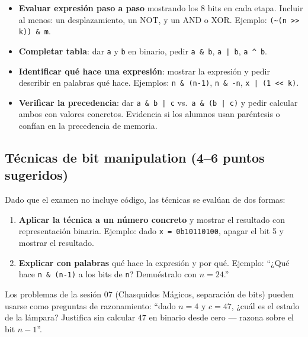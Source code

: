 \documentclass[12pt, oneside]{article}
\begin{document}
\begin{notaprofesor}
  \begin{itemize}
    \item \textbf{Evaluar expresión paso a paso} mostrando los 8 bits en cada
          etapa.  Incluir al menos: un desplazamiento, un NOT, y un AND o XOR.
          Ejemplo: \texttt{(\textasciitilde(n >> k)) \& m}.
    \item \textbf{Completar tabla}: dar \texttt{a} y \texttt{b} en binario,
          pedir \texttt{a \& b}, \texttt{a | b}, \texttt{a \textasciicircum{} b}.
    \item \textbf{Identificar qué hace una expresión}: mostrar la expresión y
          pedir describir en palabras qué hace.  Ejemplos:
          \texttt{n \& (n-1)}, \texttt{n \& -n}, \texttt{x | (1 << k)}.
    \item \textbf{Verificar la precedencia}: dar \texttt{a \& b | c} vs.\
          \texttt{a \& (b | c)} y pedir calcular ambos con valores concretos.
          Evidencia si los alumnos usan paréntesis o confían en la precedencia
          de memoria.
  \end{itemize}
\end{notaprofesor}

\subsection{Técnicas de bit manipulation (4–6 puntos sugeridos)}

\begin{notaprofesor}
  Dado que el examen no incluye código, las técnicas se evalúan de dos formas:
  \begin{enumerate}
    \item \textbf{Aplicar la técnica a un número concreto} y mostrar el resultado
          con representación binaria.  Ejemplo: dado \texttt{x = 0b10110100},
          apagar el bit 5 y mostrar el resultado.
    \item \textbf{Explicar con palabras} qué hace la expresión y por qué.
          Ejemplo: ``¿Qué hace \texttt{n \& (n-1)} a los bits de \texttt{n}?
          Demuéstralo con $n = 24$.''
  \end{enumerate}
  Los problemas de la sesión 07 (Chasquidos Mágicos, separación de bits)
  pueden usarse como preguntas de razonamiento: ``dado $n=4$ y $c=47$,
  ¿cuál es el estado de la lámpara? Justifica sin calcular $47$ en binario
  desde cero --- razona sobre el bit $n-1$''.
\end{notaprofesor}
\end{document}

